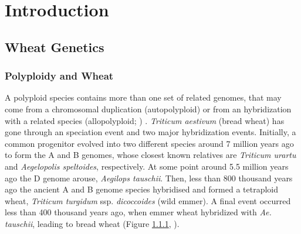 

\chapter{Introduction}



\section{Wheat Genetics}


\subsection{Polyploidy and Wheat}
\label{lit:polyploidy}

A polyploid species contains more than one set of related genomes, that may come from a chromosomal duplication (autopolyploid) or from an hybridization with a related species (allopolyploid; \citealt{Shewry2009}) . 
\textit{Triticum aestivum} (bread wheat) has gone through an speciation event and two major hybridization events. 
Initially, a common progenitor evolved into two different species around 7 million years ago to form the A and B genomes, whose closest known relatives are \textit{Triticum urartu} and \textit{Aegelopolis speltoides}, respectively. 
At some point around 5.5 million years ago the D genome arouse, \textit{Aegilops tauschii}. 
Then, less than 800 thousand years ago the ancient A and B genome species hybridised and formed a tetraploid wheat, \textit{Triticum turgidum} ssp. \textit{dicoccoides} (wild emmer). 
A final event occurred less than 400 thousand years ago, when emmer wheat hybridized with \textit{Ae. tauschii}, leading to bread wheat (Figure \ref{lit:polyploidy}, \citealt{Marcussen2014}).  

